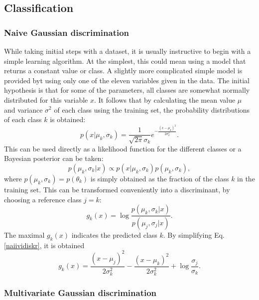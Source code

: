 \documentclass[twoside]{article}
\begin{document}
\begin{multicols}{2}
\subsection{Classification}

\subsubsection{Naive Gaussian discrimination}

While taking initial steps with a dataset, it is usually instructive to begin with a simple
learning algorithm. At the simplest, this could mean using a model that returns a constant value or
class. A slightly more complicated simple model is provided byt using only one of the eleven variables
given in the data. The initial hypothesis is that for some of the parameters, all classes are somewhat
normally distributed for this variable $x$. It follows that by calculating the mean value 
$\mu$ and variance $\sigma^2$ of each class using the training set, the probability distributions of 
each class $k$ is obtained:
\begin{equation}
 p(x|\mu_k,\sigma_k) = \frac{1}{\sqrt{2\pi} \sigma_k} e^{-\frac{(x-\mu_k)^2}{2\sigma_k^2}}.
\end{equation}
This can be used directly as a likelihood function for the different classes or a Bayesian posterior
can be taken:
\begin{equation}\label{posterior}
 p(\mu_k,\sigma_k|x) \propto p(x|\mu_k,\sigma_k) p(\mu_k,\sigma_k),
\end{equation}
where $p(\mu_k,\sigma_k) = p(\theta_k)$ is simply obtained as the fraction of the class $k$ in the 
training set. This can be transformed conveniently into a discriminant, by choosing a reference
class $j = k$:
\begin{equation}\label{naiividiskr}
 g_k(x) = \log \frac{p(\mu_k,\sigma_k|x)}{p(\mu_j,\sigma_j|x)}.
\end{equation}
The maximal $g_k(x)$ indicates the predicted class $k$. By simplifying Eq. \eqref{naiividiskr},
it is obtained
\begin{equation}\label{naiividiskr2}
 g_k(x) = \frac{(x-\mu_j)^2}{2\sigma_k^2}-\frac{(x-\mu_k)^2}{2\sigma_k^2} + 
 \log \frac{\sigma_j}{\sigma_k}.
\end{equation}


\subsubsection{Multivariate Gaussian discrimination}


\end{multicols}
\end{document}

